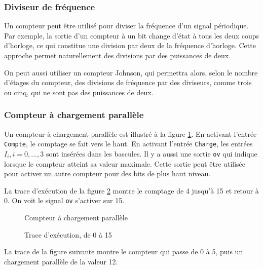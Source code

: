 \documentclass[11pt]{article}
\begin{document}
\subsubsection{Diviseur de fréquence}
\label{sec:org1ea99bf}

Un compteur peut être utilisé pour diviser la fréquence d'un signal
périodique. Par exemple, la sortie d'un compteur à un bit change
d'état à tous les deux coups d'horloge, ce qui constitue une division
par deux de la fréquence d'horloge. Cette approche permet
naturellement des divisions par des puissances de deux.

On peut aussi utiliser un compteur Johnson, qui permettra alors, selon
le nombre d'étages du compteur, des divisions de fréquence par des
diviseurs, comme trois ou cinq, qui ne sont pas des puissances de deux.

\subsubsection{Compteur à chargement parallèle}
\label{sec:org7a0ed85}

Un compteur à chargement parallèle est illustré à la figure
\ref{fig:orgcfd6be7}. En activant l'entrée \texttt{Compte}, le comptage
se fait vers le haut. En activant l'entrée \texttt{Charge}, les entrées \(I_i, i=0, \ldots, 3\) sont insérées dans les bascules. Il y a aussi une
sortie \texttt{ov} qui indique lorsque le compteur atteint sa valeur
maximale. Cette sortie peut être utilisée pour activer un autre
compteur pour des bits de plus haut niveau.

La trace d’exécution de la figure \ref{fig:orgd3cbe45}
montre le comptage de 4 jusqu'à 15 et retour à 0. On voit le signal
\texttt{ov} s'activer sur 15. 

\begin{figure}[htbp]
\centering

\caption{\label{fig:orgcfd6be7}Compteur à chargement parallèle}
\end{figure}

\begin{figure}[htbp]
\centering

\caption{\label{fig:orgd3cbe45}Trace d'exécution, de 0 à 15}
\end{figure}

La trace de la figure suivante montre le compteur qui
passe de 0 à 5, puis un chargement parallèle de la valeur 12.
\end{document}

